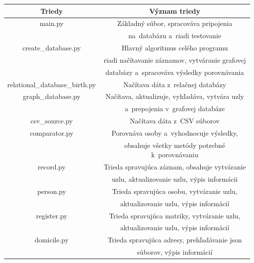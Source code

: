 \begin {table}[ht]
\label{triedy}
\begin{center}
\begin{tabular}{ |c|c|} 

\hline
Triedy                           & Význam triedy \\ \hline

 main.py                         & Základný súbor, spracováva pripojenia  \\
                                 & na~databázu a~riadi testovanie \\\hline
 create\_database.py             & Hlavný algoritmus celého programu     \\   
                                 & riadi načítavanie záznamov, vytváranie grafovej\\
                                 & databázy a~spracováva výsledky porovnávania \\ \hline
 relational\_database\_birth.py  & Načítava dáta z~relačnej databázy \\ \hline
 graph\_database.py              & Načítava, aktualizuje, vyhľadáva, vytvára uzly  \\
                                 & a~prepojenia v~grafovej databáze  \\ \hline
 csv\_source.py                  & Načítava dáta z~CSV súborov  \\ \hline
 comparator.py                   & Porovnáva osoby a~vyhodnocuje výsledky,\\
                                 & obsahuje všetky metódy potrebné k~porovnávaniu  \\ \hline
 record.py                       & Trieda spravujúca záznam, obsahuje vytváranie  \\ 
                                 & uzlu, aktualizovanie uzlu, výpis informácii \\ \hline
 person.py                       & Trieda spravujúca osobu, vytváranie uzlu, \\
                                 & aktualizovanie uzlu, výpis informácií  \\ \hline
 register.py                     & Trieda spravujúca matriky, vytváranie uzlu,  \\
                                 & aktualizovanie uzlu, výpis informácií  \\ \hline
 domicile.py                     & Trieda spravujúca adresy, prehľadávanie json  \\
                                 & súborov, výpis informácií\\ \hline

\end{tabular}
\end{center}
\end{table}
